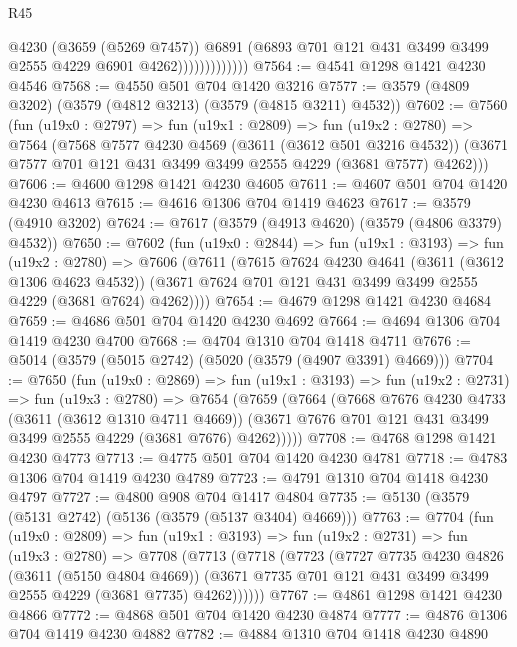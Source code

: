 \begin{lexlean}{R45}
\begin{coremodule}
                            @4230
                            (@3659 (@5269 @7457))
                            @6891
                            (@6893 @701 @121 @431 @3499 @3499 @2555 @4229 @6901 @4262)))))))))))))
@7564 := @4541 @1298 @1421 @4230 @4546
@7568 := @4550 @501 @704 @1420 @3216
@7577 := @3579 (@4809 @3202) (@3579 (@4812 @3213) (@3579 (@4815 @3211) @4532))
@7602 := @7560
    (fun (u19x0 : @2797) =>
    fun (u19x1 : @2809) =>
    fun (u19x2 : @2780) =>
    @7564
      (@7568
        @7577
        @4230
        @4569
        (@3611 (@3612 @501 @3216 @4532))
        (@3671 @7577 @701 @121 @431 @3499 @3499 @2555 @4229 (@3681 @7577) @4262)))
@7606 := @4600 @1298 @1421 @4230 @4605
@7611 := @4607 @501 @704 @1420 @4230 @4613
@7615 := @4616 @1306 @704 @1419 @4623
@7617 := @3579 (@4910 @3202)
@7624 := @7617 (@3579 (@4913 @4620) (@3579 (@4806 @3379) @4532))
@7650 := @7602
    (fun (u19x0 : @2844) =>
    fun (u19x1 : @3193) =>
    fun (u19x2 : @2780) =>
    @7606
      (@7611
        (@7615
          @7624
          @4230
          @4641
          (@3611 (@3612 @1306 @4623 @4532))
          (@3671 @7624 @701 @121 @431 @3499 @3499 @2555 @4229 (@3681 @7624) @4262))))
@7654 := @4679 @1298 @1421 @4230 @4684
@7659 := @4686 @501 @704 @1420 @4230 @4692
@7664 := @4694 @1306 @704 @1419 @4230 @4700
@7668 := @4704 @1310 @704 @1418 @4711
@7676 := @5014 (@3579 (@5015 @2742) (@5020 (@3579 (@4907 @3391) @4669)))
@7704 := @7650
    (fun (u19x0 : @2869) =>
    fun (u19x1 : @3193) =>
    fun (u19x2 : @2731) =>
    fun (u19x3 : @2780) =>
    @7654
      (@7659
        (@7664
          (@7668
            @7676
            @4230
            @4733
            (@3611 (@3612 @1310 @4711 @4669))
            (@3671 @7676 @701 @121 @431 @3499 @3499 @2555 @4229 (@3681 @7676) @4262)))))
@7708 := @4768 @1298 @1421 @4230 @4773
@7713 := @4775 @501 @704 @1420 @4230 @4781
@7718 := @4783 @1306 @704 @1419 @4230 @4789
@7723 := @4791 @1310 @704 @1418 @4230 @4797
@7727 := @4800 @908 @704 @1417 @4804
@7735 := @5130 (@3579 (@5131 @2742) (@5136 (@3579 (@5137 @3404) @4669)))
@7763 := @7704
    (fun (u19x0 : @2809) =>
    fun (u19x1 : @3193) =>
    fun (u19x2 : @2731) =>
    fun (u19x3 : @2780) =>
    @7708
      (@7713
        (@7718
          (@7723
            (@7727
              @7735
              @4230
              @4826
              (@3611 (@5150 @4804 @4669))
              (@3671 @7735 @701 @121 @431 @3499 @3499 @2555 @4229 (@3681 @7735) @4262))))))
@7767 := @4861 @1298 @1421 @4230 @4866
@7772 := @4868 @501 @704 @1420 @4230 @4874
@7777 := @4876 @1306 @704 @1419 @4230 @4882
@7782 := @4884 @1310 @704 @1418 @4230 @4890

\end{coremodule}
\end{lexlean}
